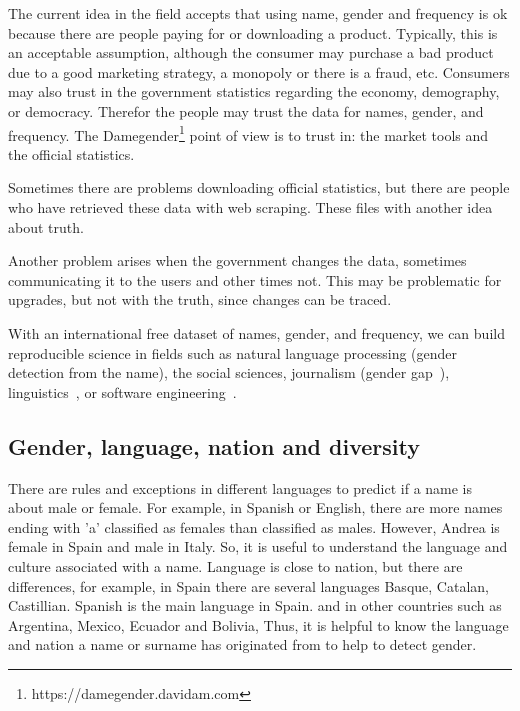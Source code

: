 \documentclass[a4paper]{article}
\begin{document}
The current idea in the field accepts that using name, gender and
frequency is ok because there are people paying for or downloading
a product. Typically, this is an acceptable assumption, although
the consumer may purchase a bad product due to a good marketing
strategy, a monopoly or there is a fraud, etc. Consumers may also 
trust in the government statistics regarding the economy,
demography, or democracy. Therefor the people may trust the data
for names, gender, and frequency. The
Damegender\footnote{https://damegender.davidam.com} point of view
is to trust in: the market tools and the official statistics.

Sometimes there are problems downloading official statistics, but
there are people who have retrieved these data with web scraping.
These files with another idea about truth.

Another problem arises when the government changes the data,
sometimes communicating it to the users and other times
not. This may be problematic for upgrades, but not with the truth,
since changes can be traced. 

With an international free dataset of names, gender, and frequency,
we can build reproducible science in fields such as natural language
processing (gender detection from the name), the social sciences, 
journalism (gender
gap~\cite{holman2018gender,mislove2011understanding,niemi2017gendered,de2014genero}),
linguistics~\cite{lawson2005russian,krueger1962mongolian,van2020gender,agyekum2006sociolinguistic,fraser1987lexicon},
or software engineering~\cite{vasilescu2012gender}.

\subsection{Gender, language, nation and diversity}
\label{sec:diversity}

There are rules and exceptions in different languages to predict if
a name is about male or female. For example, in Spanish or English,
there are more names ending with 'a' classified as females than
classified as males. However, Andrea is female in Spain and
male in Italy. So, it is useful to understand the language and culture
associated with a name. Language is close to nation, but there are
differences, for example, in Spain there are several languages Basque,
Catalan, Castillian. Spanish is the main language in Spain.
and in other countries such as Argentina, Mexico, Ecuador and Bolivia,
Thus, it is helpful to know the language and nation a name or surname
has originated from to help to detect gender.
\end{document}
